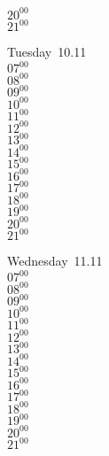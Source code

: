 \documentclass[11pt,a4paper]{book}\usepackage[]{graphicx}\usepackage[]{color}
\begin{document}
{{{{{{{{{{{{{{{{{{\begin{tcolorbox}
{$20^{00}$\\
$21^{00}$}\\
\end{tcolorbox}
%
\begin{tcolorbox}
Tuesday~10.11\\
{ 
$07^{00}$\\
$08^{00}$\\
$09^{00}$\\
$10^{00}$\\
$11^{00}$\\
$12^{00}$\\
$13^{00}$\\
$14^{00}$\\
$15^{00}$\\
$16^{00}$\\
$17^{00}$\\
$18^{00}$\\
$19^{00}$\\
$20^{00}$\\
$21^{00}$}\\
\end{tcolorbox}
%
\begin{tcolorbox}
Wednesday~11.11\\
{ 
$07^{00}$\\
$08^{00}$\\
$09^{00}$\\
$10^{00}$\\
$11^{00}$\\
$12^{00}$\\
$13^{00}$\\
$14^{00}$\\
$15^{00}$\\
$16^{00}$\\
$17^{00}$\\
$18^{00}$\\
$19^{00}$\\
$20^{00}$\\
$21^{00}$}\\
\end{tcolorbox}
\clearpage
%
}}}}}}}}}}}}}}}}}}
\end{document}
